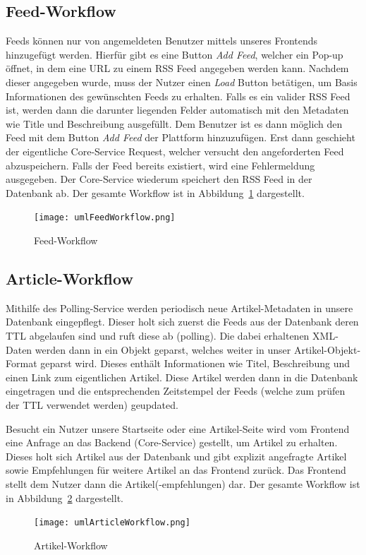 \subsection{Feed-Workflow}
Feeds können nur von angemeldeten Benutzer mittels unseres Frontends hinzugefügt werden. Hierfür gibt es eine Button \textit{Add Feed}, welcher ein Pop-up öffnet, in dem eine \ac{URL} zu einem \ac{RSS} Feed angegeben werden kann.
Nachdem dieser angegeben wurde, muss der Nutzer einen \textit{Load} Button betätigen, um Basis Informationen des gewünschten Feeds zu erhalten.
Falls es ein valider RSS Feed ist, werden dann die darunter liegenden Felder automatisch mit den Metadaten wie Title und Beschreibung ausgefüllt.
Dem Benutzer ist es dann möglich den Feed mit dem Button \textit{Add Feed} der Plattform hinzuzufügen.
Erst dann geschieht der eigentliche Core-Service Request, welcher versucht den angeforderten Feed abzuspeichern. Falls der Feed bereits existiert, wird eine Fehlermeldung ausgegeben.
Der Core-Service wiederum speichert den RSS Feed in der Datenbank ab. Der gesamte Workflow ist in Abbildung~\ref{fig:feedWorkflow} dargestellt.
\begin{figure}[!hbt]
    \texttt{[image: umlFeedWorkflow.png]}
    \caption{Feed-Workflow}
    \label{fig:feedWorkflow}
\end{figure}

\subsection{Article-Workflow}
Mithilfe des Polling-Service werden periodisch neue Artikel-Metadaten in unsere Datenbank eingepflegt. Dieser holt sich zuerst die Feeds aus der Datenbank deren \ac{TTL} abgelaufen sind und ruft diese ab (polling).
Die dabei erhaltenen XML-Daten werden dann in ein Objekt geparst, welches weiter in unser Artikel-Objekt-Format geparst wird. Dieses enthält Informationen wie Titel, Beschreibung und einen Link zum eigentlichen Artikel.
Diese Artikel werden dann in die Datenbank eingetragen und die entsprechenden Zeitstempel der Feeds (welche zum prüfen der \acs{TTL} verwendet werden) geupdated.

Besucht ein Nutzer unsere Startseite oder eine Artikel-Seite wird vom Frontend eine Anfrage an das Backend (Core-Service) gestellt, um Artikel zu erhalten. Dieses holt sich Artikel aus der Datenbank und gibt explizit
angefragte Artikel sowie Empfehlungen für weitere Artikel an das Frontend zurück. Das Frontend stellt dem Nutzer dann die Artikel(-empfehlungen) dar. Der gesamte Workflow ist in Abbildung~\ref{fig:articleWorkflow} dargestellt.

\begin{figure}[!hbt]
    \texttt{[image: umlArticleWorkflow.png]}
    \caption{Artikel-Workflow}
    \label{fig:articleWorkflow}
\end{figure}

